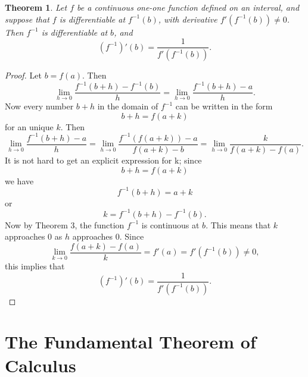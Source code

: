 \documentclass{article}
\numberwithin{corollary}{subsection}
\numberwithin{definition}{subsection}
\numberwithin{lemma}{subsection}
\newtheorem{theorem}{Theorem}
\numberwithin{theorem}{subsection}
\begin{document}
\begin{theorem}
  Let $f$ be a continuous one-one function defined on an interval, and suppose
  that $f$ is differentiable at $f^{-1}(b)$, with derivative $f'(f^{-1}(b))
  \neq 0$. Then $f^{-1}$ is differentiable at $b$, and \[
    (f^{-1})'(b) = \frac{1}{f'(f^{-1}(b))}.
  \]
\end{theorem}
\begin{proof}
  Let $b = f(a)$. Then \[
    \lim_{h \to 0} \frac{f^{-1}(b + h) - f^{-1}(b)}{h}
    = \lim_{h \to 0} \frac{f^{-1}(b + h) - a}{h}.
  \] Now every number $b + h$ in the domain of $f^{-1}$ can be written in the
  form \[
    b + h = f(a + k)
  \] for an unique $k$. Then \[
    \lim_{h \to 0} \frac{f^{-1}(b + h) - a}{h}
    = \lim_{h \to 0} \frac{f^{-1}(f(a + k)) - a}{f(a + k) - b}
    = \lim_{h \to 0} \frac{k}{f(a + k) - f(a)}.
  \] It is not hard to get an explicit expression for k; since \[
    b + h = f(a + k)
  \] we have \[
    f^{-1}(b + h) = a + k
  \] or \[
    k = f^{-1}(b + h) - f^{-1}(b).
  \] Now by Theorem 3, the function $f^{-1}$ is continuous at $b$. This means
  that $k$ approaches 0 as $h$ approaches 0. Since \[
    \lim_{k \to 0} \frac{f(a + k) - f(a)}{k} = f'(a) = f'(f^{-1}(b)) \neq 0,
  \] this implies that \[
    (f^{-1})'(b) = \frac{1}{f'(f^{-1}(b))}.
  \]
\end{proof}

\section{The Fundamental Theorem of Calculus}
\end{document}
